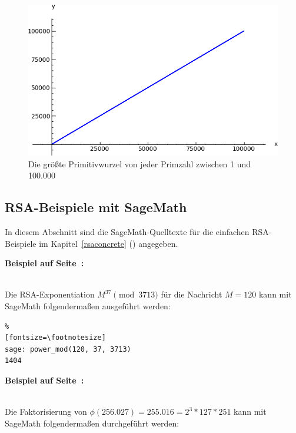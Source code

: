 \begin{refsegment}
\begin{figure}[!htbp]
\centering
\includegraphics{figures/primitive-roots-largest.png}
\caption{Die größte Primitivwurzel von jeder Primzahl zwischen 1 und 100.000}
\label{fig:primitive_roots_largest}
\end{figure}




\hypertarget{NumberTheory_Sage_RSA_sample}{}
\subsection{RSA-Beispiele mit SageMath}
\label{l:NumberTheory_Sage_RSA_sample}{}

 In diesem Abschnitt sind die SageMath-Quelltexte für die einfachen RSA-Beispiele
im Kapitel~\ref{rsaconcrete} (\glqq {}\grqq) angegeben.

\hypertarget{nt:AppArith4a}{%
 \textbf{Beispiel auf Seite~\pageref{SrcArith4a}:}}
\label{nt:AppArith4a}\\
Die RSA-Exponentiation $M^{37} \pmod{3713}$ für die Nachricht $M = 120$ kann
mit SageMath folgendermaßen ausgeführt werden:

\begin{Verbatim}%
[fontsize=\footnotesize]
sage: power_mod(120, 37, 3713)
1404
\end{Verbatim}


\hypertarget{nt:AppArith4b}{%
 \textbf{Beispiel auf Seite~\pageref{SrcArith4b}:}}
\label{nt:AppArith4b}\\
Die Faktorisierung von $\phi(256.027) = 255.016 = 2^3 * 127 * 251$ kann mit SageMath
folgendermaßen durchgeführt werden:


\end{refsegment}
